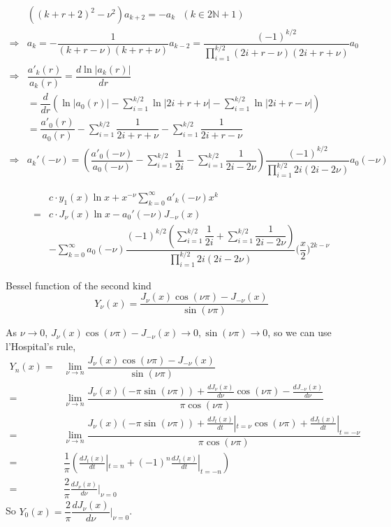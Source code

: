 \documentclass{beamer}
\begin{document}
\begin{frame}
\begin{align*}
&((k+r+2)^2-\nu^2)a_{k+2}=-a_k \,\,\,\,(k\in2\mathbb{N}+1)\\
\Rightarrow&a_{k}=-\dfrac{1}{(k+r-\nu)(k+r+\nu)}a_{k-2}=\dfrac{(-1)^{k/2}}{\prod\limits_{i=1}^{k/2}(2i+r-\nu)(2i+r+\nu)}a_0\\
\Rightarrow&\dfrac{a'_k(r)}{a_{k}(r)}=\dfrac{d\ln |a_{k}(r)|}{d r}\\
&=\dfrac{d }{d r}(\ln |a_0(r)|-\sum\limits_{i=1}^{k/2}\ln|2i+r+\nu|-\sum\limits_{i=1}^{k/2}\ln|2i+r-\nu|)\\
&=\dfrac{a'_0(r)}{a_0(r)}-\sum\limits_{i=1}^{k/2}\dfrac{1}{2i+r+\nu}-\sum\limits_{i=1}^{k/2}\dfrac{1}{2i+r-\nu}\\
\Rightarrow& a_k'(-\nu)=(\dfrac{a'_0(-\nu)}{a_0(-\nu)}-\sum\limits_{i=1}^{k/2}\dfrac{1}{2i}-\sum\limits_{i=1}^{k/2}\dfrac{1}{2i-2\nu})\dfrac{(-1)^{k/2}}{\prod\limits_{i=1}^{k/2}2i(2i-2\nu)}a_0(-\nu)
\end{align*}

\end{frame}
\begin{frame}
\begin{align*}
&c\cdot y_1(x)\ln x+x^{-\nu}\sum\limits_{k=0}^{\infty}a'_k(-\nu)x^k\\
=&c\cdot J_{\nu}(x)\ln x-a_0'(-\nu)J_{-\nu}(x)\\
&-\sum\limits_{k=0}^{\infty}a_0(-\nu)\dfrac{(-1)^{k/2}(\sum\limits_{i=1}^{k/2}\dfrac{1}{2i}+\sum\limits_{i=1}^{k/2}\dfrac{1}{2i-2\nu})}{\prod\limits_{i=1}^{k/2}2i(2i-2\nu)}\Big(\dfrac{x}{2}\Big)^{2k-\nu}
\end{align*}
\begin{block}{Bessel function of the second kind}
$$Y_{\nu}(x)=\dfrac{J_{\nu}(x)\cos(\nu \pi)-J_{-\nu}(x)}{\sin(\nu \pi)}$$
\end{block}

\end{frame}

\begin{frame}
As $\nu\rightarrow0$, $J_{\nu}(x)\cos(\nu \pi)-J_{-\nu}(x)\rightarrow0,\sin(\nu \pi)\rightarrow0$, so we can use l'Hospital's rule,
\begin{align*}
Y_n(x)=&\underset{\nu\rightarrow n}{\lim}\dfrac{J_{\nu}(x)\cos(\nu \pi)-J_{-\nu}(x)}{\sin(\nu \pi)}\\
=&\underset{\nu\rightarrow n}{\lim}\dfrac{J_{\nu}(x)(-\pi\sin(\nu \pi))+\frac{dJ_{\nu}(x)}{d\nu}\cos(\nu\pi)-\frac{dJ_{-\nu}(x)}{d\nu}}{\pi\cos(\nu \pi)}\\
=&\underset{\nu\rightarrow n}{\lim}\dfrac{J_{\nu}(x)(-\pi\sin(\nu \pi))+\frac{dJ_{t}(x)}{dt}|_{t=\nu}\cos(\nu\pi)+\frac{dJ_{t}(x)}{dt}|_{t=-\nu}}{\pi\cos(\nu \pi)}\\
=&\dfrac{1}{\pi}(\frac{dJ_{t}(x)}{dt}|_{t=n}+(-1)^n\frac{dJ_{t}(x)}{dt}|_{t=-n})\\
=&\dfrac{2}{\pi}\frac{dJ_{\nu}(x)}{d\nu}|_{\nu=0}
\end{align*}
So $Y_0(x)=\dfrac{2}{\pi}\dfrac{dJ_{\nu}(x)}{d\nu}|_{\nu=0}$.
\end{frame}
\end{document}
